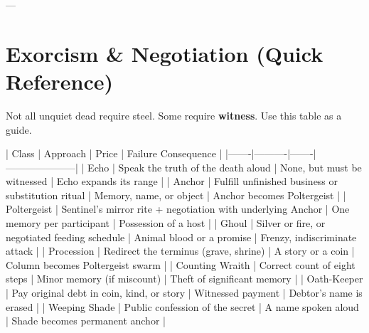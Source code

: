 ---

\section*{Exorcism & Negotiation (Quick Reference)}

Not all unquiet dead require steel. Some require \textbf{witness}. Use this table as a guide.

| Class | Approach | Price | Failure Consequence |
|-------|----------|-------|---------------------|
| Echo | Speak the truth of the death aloud | None, but must be witnessed | Echo expands its range |
| Anchor | Fulfill unfinished business or substitution ritual | Memory, name, or object | Anchor becomes Poltergeist |
| Poltergeist | Sentinel's mirror rite + negotiation with underlying Anchor | One memory per participant | Possession of a host |
| Ghoul | Silver or fire, or negotiated feeding schedule | Animal blood or a promise | Frenzy, indiscriminate attack |
| Procession | Redirect the terminus (grave, shrine) | A story or a coin | Column becomes Poltergeist swarm |
| Counting Wraith | Correct count of eight steps | Minor memory (if miscount) | Theft of significant memory |
| Oath-Keeper | Pay original debt in coin, kind, or story | Witnessed payment | Debtor's name is erased |
| Weeping Shade | Public confession of the secret | A name spoken aloud | Shade becomes permanent anchor |



